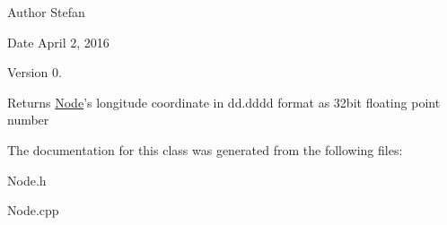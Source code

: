 \begin{DoxyAuthor}{Author}
Stefan 
\end{DoxyAuthor}
\begin{DoxyDate}{Date}
April 2, 2016 
\end{DoxyDate}
\begin{DoxyVersion}{Version}
0.
\end{DoxyVersion}
\begin{DoxyReturn}{Returns}
\hyperlink{classNode}{Node}'s longitude coordinate in dd.\+dddd format as 32bit floating point number 
\end{DoxyReturn}


The documentation for this class was generated from the following files\+:\begin{DoxyCompactItemize}
\item 
Node.\+h\item 
Node.\+cpp\end{DoxyCompactItemize}
